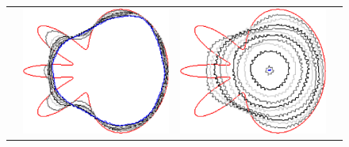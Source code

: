 \begin{figure}
\begin{tabular}{p{2.5em}ccc}
& \includegraphics[scale=0.24]{figures/chapter6/radius-effect/flower/improve/len_pen0.5/radius-3/summary.pdf} &
\includegraphics[scale=0.24]{figures/chapter6/radius-effect/flower/improve/len_pen0.5/radius-5/summary.pdf} &

\end{tabular}
\end{figure}
